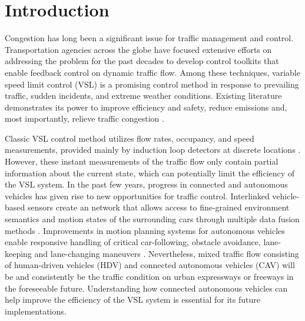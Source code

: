 \documentclass[11pt, letterpaper]{article}
\begin{document}


\section{Introduction}
Congestion has long been a significant issue for traffic management and control. Transportation agencies across the globe have focused extensive efforts on addressing the problem for the past decades to develop control toolkits that enable feedback control on dynamic traffic flow. Among these techniques, variable speed limit control (VSL) is a promising control method in response to prevailing traffic, sudden incidents, and extreme weather conditions. Existing literature demonstrates its power to improve efficiency and safety, reduce emissions and, most importantly, relieve traffic congestion \citep{hegyi2005model, allaby2007variable, li2016optimal, yang2013proactive}.

Classic VSL control method utilizes flow rates, occupancy, and speed measurements, provided mainly by induction loop detectors at discrete locations \citep{HCM2000}. However, these instant measurements of the traffic flow only contain partial information about the current state, which can potentially limit the efficiency of the VSL system. In the past few years, progress in connected and autonomous vehicles has given rise to new opportunities for traffic control. Interlinked vehicle-based sensors create an network that allows access to fine-grained environment semantics and motion states of the surrounding cars through multiple data fusion methods \citep{liggins1997distributed, lee2008unscented, taj2011distributed}. Improvements in motion planning systems for autonomous vehicles enable responsive handling of critical car-following, obstacle avoidance, lane-keeping and lane-changing maneuvers \citep{claussmann2019review}. Nevertheless, mixed traffic flow consisting of human-driven vehicles (HDV) and connected autonomous vehicles (CAV) will be and consistently be the traffic condition on urban expressways or freeways in the foreseeable future. Understanding how connected autonomous vehicles can help improve the efficiency of the VSL system is essential for its future implementations.
\end{document}
